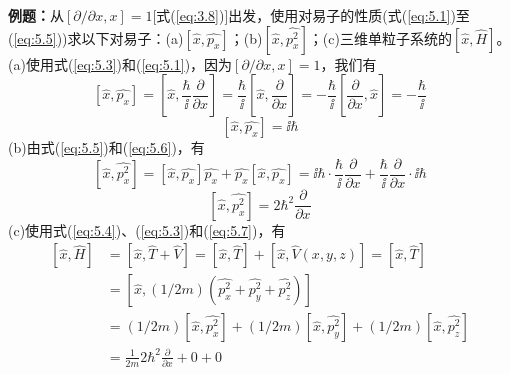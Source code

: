     \begin{examplebox}
        \textbf{例题：}从$\left[\partial/\partial x,x\right]=1$[式(\ref{eq:3.8})]出发，使用对易子的性质(式(\ref{eq:5.1})至(\ref{eq:5.5}))求以下对易子：(a)$\left[\hat{x},\hat{p_x}\right]$；(b)$\left[\hat{x}, \hat{p_x^2}\right]$；(c)三维单粒子系统的$\left[\hat{x},\hat{H}\right]$。
        \\
        (a)使用式(\ref{eq:5.3})和(\ref{eq:5.1})，因为$\left[\partial/\partial x,x\right]=1$，我们有
        \begin{equation*}
            \left[\hat{x},\hat{p_x}\right] = \left[\hat{x},\frac{\hbar}{\ii }\frac{\partial}{\partial x}\right] = \frac{\hbar}{\ii }\left[\hat{x},\frac{\partial}{\partial x}\right] = -\frac{\hbar}{\ii }\left[\frac{\partial}{\partial x},\hat{x}\right] = -\frac{\hbar}{\ii }
        \end{equation*}
        \begin{equation}
            \left[\hat{x},\hat{p_x}\right]=\ii \hbar
            \label{eq:5.6}
        \end{equation}
        (b)由式(\ref{eq:5.5})和(\ref{eq:5.6})，有
        \begin{equation*}
            \left[\hat{x},\hat{p_x^2}\right] = \left[\hat{x},\hat{p_x}\right]\hat{p_x} + \hat{p_x}\left[\hat{x},\hat{p_x}\right] = \ii \hbar\cdot\frac{\hbar}{\ii }\frac{\partial}{\partial x} + \frac{\hbar}{\ii }\frac{\partial}{\partial x} \cdot \ii \hbar
        \end{equation*}
        \begin{equation}
            \left[\hat{x},\hat{p_x^2}\right] = 2\hbar^2\frac{\partial}{\partial x}
            \label{eq:5.7}
        \end{equation}
        (c)使用式(\ref{eq:5.4})、(\ref{eq:5.3})和(\ref{eq:5.7})，有
        \begin{equation*}
            \begin{aligned}
                \left[\hat{x},\hat{H}\right] &= \left[\hat{x},\hat{T}+\hat{V}\right] = \left[\hat{x},\hat{T}\right] + \left[\hat{x},\hat{V}\left(x,y,z\right)\right] =\left[\hat{x},\hat{T}\right] \\
                &= \left[\hat{x}, \left(1/2m\right)\left(\hat{p_x^2}+\hat{p_y^2}+\hat{p_z^2}\right)\right]\\
                &= \left(1/2m\right)\left[\hat{x},\hat{p_x^2}\right] + \left(1/2m\right)\left[\hat{x},\hat{p_y^2}\right] + \left(1/2m\right)\left[\hat{x},\hat{p_z^2}\right]\\
                &= \frac{1}{2m}2\hbar^2\frac{\partial}{\partial x} + 0 + 0

\end{aligned}
\end{equation*}
\end{examplebox}
